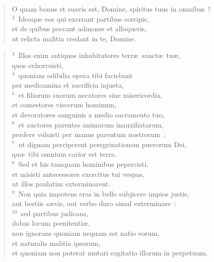 \begin{flushleft}\begin{verse}\vspace{-19pt}\hspace{6pt}O quam bonus et suavis est, Domine, spiritus tuus in omnibus~!\\\hspace{6pt}
${}^{2}$~Ideoque eos qui exerrant partibus corripis,\\ et de quibus peccant admones et alloqueris,\\ ut relicta malitia credant in te, Domine.\end{verse}\end{flushleft}


\begin{flushleft}\begin{verse}${}^{3}$~Illos enim antiquos inhabitatores terr\ae\ sanct\ae\ tu\ae ,\\ quos exhorruisti,\\
${}^{4}$~quoniam odibilia opera tibi faciebant\\ per medicamina et sacrificia injusta,\\
${}^{5}$~et filiorum suorum necatores sine misericordia,\\ et comestores viscerum hominum,\\ et devoratores sanguinis a medio sacramento tuo,\\
${}^{6}$~et auctores parentes animarum inauxiliatarum,\\ perdere voluisti per manus parentum nostrorum~:\\
${}^{7}$~ut dignam perciperent peregrinationem puerorum Dei,\\ qu\ae\ tibi omnium carior est terra.\\
${}^{8}$~Sed et his tamquam hominibus pepercisti,\\ et misisti antecessores exercitus tui vespas,\\ ut illos paulatim exterminarent.\\
${}^{9}$~Non quia impotens eras in bello subjicere impios justis,\\ aut bestiis s\ae vis, aut verbo duro simul exterminare~:\\
${}^{10}$~sed partibus judicans,\\ dabas locum pœnitenti\ae ,\\ non ignorans quoniam nequam est natio eorum,\\ et naturalis malitia ipsorum,\\ et quoniam non poterat mutari cogitatio illorum in perpetuum.\\

\end{verse}
\end{flushleft}
